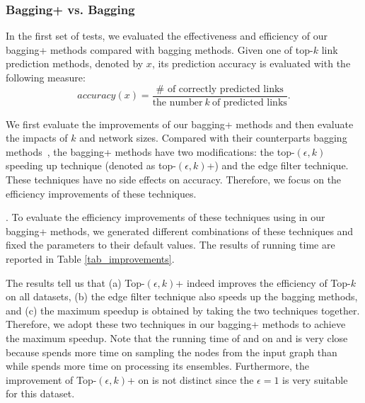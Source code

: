 \subsubsection{Bagging+ vs. Bagging}
In the first set of tests, we evaluated the effectiveness and efficiency of our bagging+ methods
compared with bagging methods. Given one of top-$k$ link prediction methods, denoted by $x$, its prediction accuracy is evaluated with the following measure:
\begin{equation}
accuracy(x) = \frac{\# \textrm{ of correctly predicted links}}{\textrm{the number} \ k\ \textrm{of predicted links}}.
\end{equation}


We first evaluate the improvements of our bagging+ methods and then
evaluate the impacts of $k$ and network sizes.
Compared with their counterparts bagging methods~\cite{liang2016}, the bagging+ methods have two modifications:
the top-$(\epsilon, k)$ speeding up technique (denoted as top-$(\epsilon, k)$+) and the edge filter technique.
These techniques have no side effects on accuracy.
Therefore, we focus on the efficiency improvements of these techniques.


. To evaluate the
efficiency improvements of these techniques using in our
bagging+ methods, we generated different combinations
of these techniques and fixed the parameters to their default values.
The results of running time are reported in Table \ref{tab_improvements}.

The results tell us that (a) Top-$(\epsilon, k)$+ indeed improves
the efficiency of Top-$k$ on all datasets,
(b) the edge filter technique also speeds up the bagging methods,
and (c) the maximum speedup is obtained by taking the
two techniques together. Therefore, we adopt these two techniques
in our bagging+ methods to achieve the maximum speedup.
Note that the running time of \Biasedp and \Nodep on \YouTube and \Wikipedia
is very close because \Biasedp spends more time on sampling the nodes
from the input graph than \Nodep while \Nodep spends more time on processing
its ensembles. Furthermore, the improvement of Top-$(\epsilon, k)$+ on \Wikipedia is not
distinct since the $\epsilon = 1$ is very suitable for this dataset.

